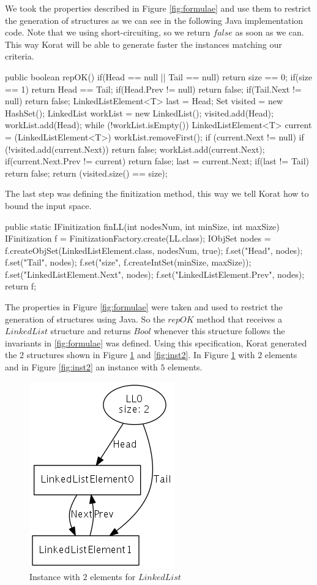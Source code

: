 We took the properties described in Figure \ref{fig:formulae} and use them to restrict the generation of structures as we can see in the following Java implementation code.
Note that we using short-circuiting, so we return $false$ as soon as we can. This way Korat will be able to generate faster the instances matching our criteria.

\begin{code}
public boolean repOK() {
  if(Head == null || Tail == null)
    return size == 0;
  if(size == 1) return Head == Tail;
  if(Head.Prev != null) return false;
  if(Tail.Next != null) return false;
  LinkedListElement<T> last = Head;
  Set visited = new HashSet();
  LinkedList workList = new LinkedList();
  visited.add(Head);
  workList.add(Head);
  while (!workList.isEmpty()) {
    LinkedListElement<T> current = (LinkedListElement<T>) workList.removeFirst();
    if (current.Next != null) {
      if (!visited.add(current.Next))
	    return false;
      workList.add(current.Next);
      if(current.Next.Prev != current) return false;
      last = current.Next;
    }
  }
  if(last != Tail)
    return false;
  return (visited.size() == size);
}
\end{code}

The last step was defining the finitization method, this way we tell Korat how to bound the input space.

\begin{code}
public static IFinitization finLL(int nodesNum, int minSize, int maxSize) {
  IFinitization f = FinitizationFactory.create(LL.class);
  IObjSet nodes = f.createObjSet(LinkedListElement.class, nodesNum, true);
  f.set("Head", nodes);
  f.set("Tail", nodes);
  f.set("size", f.createIntSet(minSize, maxSize));
  f.set("LinkedListElement.Next", nodes);
  f.set("LinkedListElement.Prev", nodes);
  return f;
}
\end{code}

The properties in Figure \ref{fig:formulae} were taken and used to restrict the generation of structures using Java. So the $repOK$ method that receives
a $LinkedList$ structure and returns $Bool$ whenever this structure follows the invariants in \ref{fig:formulae} was defined.
Using this specification, Korat generated the 2 structures shown in Figure \ref{fig:inst1} and \ref{fig:inst2}. In Figure \ref{fig:inst1} with $2$ elements
and in Figure \ref{fig:inst2} an instance with $5$ elements.

\begin{figure}[!ht]
\center \includegraphics[width=.3\textwidth]{images/ll1}
\caption{Instance with $2$ elements for $LinkedList$}
\label{fig:inst1}
\end{figure}

